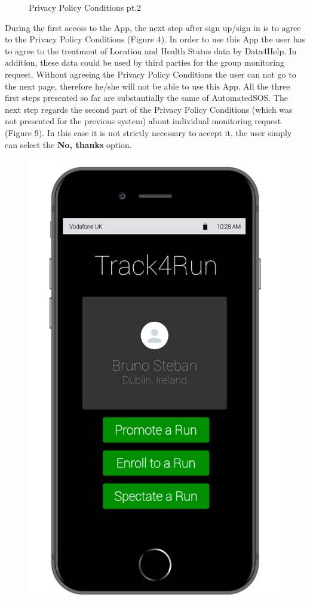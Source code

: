 \begin{enumerate}
\begin{figure}[H]
\begin{center}
\begin{minipage}[c]{.40\textwidth}
	\caption{Privacy Policy Conditions pt.2}
        \end{minipage}
      \end{center}
\end{figure}
During the first access to the App, the next step after sign up/sign in is to agree to the Privacy Policy Conditions (Figure 4). In order to use this App the user has to agree to the treatment of Location and Health Status data by Data4Help. In addition, these data could be used by third parties for the group monitoring request. Without agreeing the Privacy Policy Conditions the user can not go to the next page, therefore he/she will not be able to use this App. All the three first steps presented so far are substantially the same of AutomatedSOS. The next step regards the second part of the Privacy Policy Conditions (which was not presented for the previous system) about individual monitoring request (Figure 9).  In this case it is not strictly necessary to accept it, the user simply can select the \textbf{No, thanks} option.
\clearpage
\begin{figure}[H]
\begin{center}
        \begin{minipage}[c]{.40\textwidth}
        \centering
          \includegraphics[height=14 cm]{Images/Mockups/Track4RunMockup5.jpg}

\end{minipage}
\end{center}
\end{figure}
\end{enumerate}
